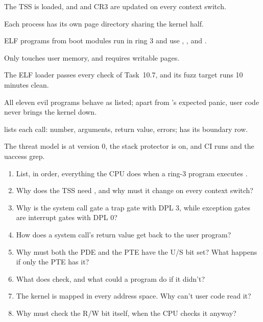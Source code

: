 \documentclass[11pt,a4paper]{article}
\begin{document}
\begin{milestonebox}
\begin{checklist}
  \item The TSS is loaded, and  and CR3 are updated on every context switch.
  \item Each process has its own page directory sharing the kernel half.
  \item ELF programs from boot modules run in ring 3 and use , ,  and .
  \item Only  touches user memory, and  requires writable pages.
  \item The ELF loader passes every check of Task~10.7, and its fuzz target runs 10 minutes clean.
  \item All eleven evil programs behave as listed; apart from 's expected panic, user code never brings the kernel down.
  \item {} lists each call: number, arguments, return value, errors;  has its boundary row.
  \item The threat model is at version 0, the stack protector is on, and CI runs  and the uaccess grep.
\end{checklist}
\end{milestonebox}

\begin{questionbox}
\begin{enumerate}
  \item List, in order, everything the CPU does when a ring-3 program executes .
  \item Why does the TSS need , and why must it change on every context switch?
  \item Why is the system call gate a trap gate with DPL 3, while exception gates are interrupt gates with DPL 0?
  \item How does a system call's return value get back to the user program?
  \item Why must both the PDE and the PTE have the U/S bit set? What happens if only the PTE has it?
  \item What does  check, and what could a program do if it didn't?
  \item The kernel is mapped in every address space. Why can't user code read it?
  \item Why must  check the R/W bit itself, when the CPU checks it anyway?
\end{enumerate}
\end{questionbox}
\end{document}
